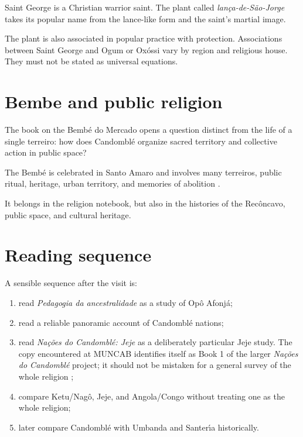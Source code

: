Saint George is a Christian warrior saint.
The plant called
\emph{lan\c{c}a-de-S\~ao-Jorge} takes its
popular name from the lance-like form and
the saint's martial image.

The plant is also associated in popular
practice with protection.  Associations
between Saint George and Ogum or Ox\'ossi
vary by region and religious house.  They
must not be stated as universal equations.

\section{Bembe and public religion}
\label{section-bembe-public-religion}

The book on the Bemb\'e do Mercado opens a
question distinct from the life of a single
terreiro: how does Candombl\'e organize
sacred territory and collective action in
public space?

The Bemb\'e is celebrated in Santo Amaro
and involves many terreiros, public ritual,
heritage, urban territory, and memories of
abolition \cite{ufrb2026bembe}.

It belongs in the religion notebook, but
also in the histories of the Rec\^oncavo,
public space, and cultural heritage.

\section{Reading sequence}
\label{section-religion-reading}

A sensible sequence after the visit is:

\begin{enumerate}
\item read
\emph{Pedagogia da ancestralidade}
as a study of Op\^o Afonj\'a;
\item read a reliable panoramic account of
Candombl\'e nations;
\item read
\emph{Na\c{c}\~oes do Candombl\'e: Jeje}
as a deliberately particular Jeje study.
The copy encountered at MUNCAB identifies
itself as Book 1 of the larger
\emph{Na\c{c}\~oes do Candombl\'e}
project; it should not be mistaken for a
general survey of the whole religion
\cite{ufrb2026nacoes};
\item compare Ketu/Nag\^o, Jeje, and
Angola/Congo without treating one as the
whole religion;
\item later compare Candombl\'e with Umbanda
and Santer\'\i a historically.
\end{enumerate}





